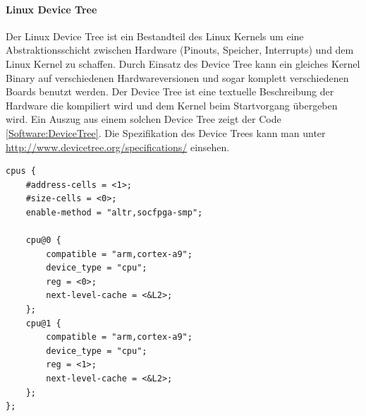 \paragraph{Linux Device Tree} Der Linux Device Tree ist ein Bestandteil des Linux Kernels um eine Abstraktionsschicht zwischen Hardware (Pinouts, Speicher, Interrupts) und dem Linux Kernel zu schaffen. Durch Einsatz des Device Tree kann ein gleiches Kernel Binary auf verschiedenen Hardwareversionen und sogar komplett verschiedenen Boards benutzt werden. Der Device Tree ist eine textuelle Beschreibung der Hardware die kompiliert wird und dem Kernel beim Startvorgang übergeben wird. Ein Auszug aus einem solchen Device Tree zeigt der Code \ref{Software:DeviceTree}. Die Spezifikation des Device Trees kann man unter \href{http://www.devicetree.org/specifications/}{http://www.devicetree.org/specifications/} einsehen.

\begin{lstlisting}[caption={[Auszug aus socfpga.dtsi]Auszug aus socfpga.dtsi \cite[Version~4.7, \texttt{arch/arm/boot/dts/socfpga.dtsi}]{Linux_Kernel}}, label=Software:DeviceTree]
cpus {
	#address-cells = <1>;
	#size-cells = <0>;
	enable-method = "altr,socfpga-smp";
	
	cpu@0 {
		compatible = "arm,cortex-a9";
		device_type = "cpu";
		reg = <0>;
		next-level-cache = <&L2>;
	};
	cpu@1 {
		compatible = "arm,cortex-a9";
		device_type = "cpu";
		reg = <1>;
		next-level-cache = <&L2>;
	};
};
\end{lstlisting}

